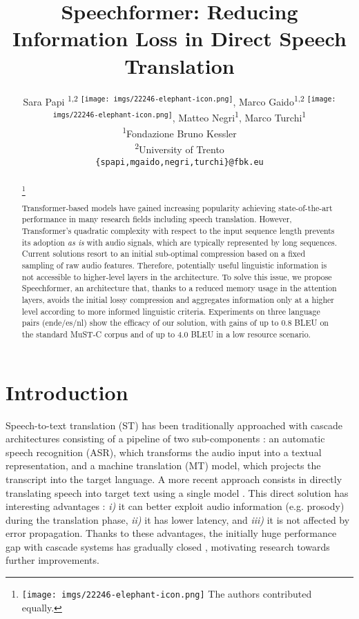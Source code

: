 \documentclass[11pt]{article}
\title{Speechformer: Reducing Information Loss in Direct Speech Translation}
\author{Sara Papi \textsuperscript{1,2 \texttt{[image: imgs/22246-elephant-icon.png]}}, Marco Gaido\textsuperscript{1,2 \texttt{[image: imgs/22246-elephant-icon.png]}}, Matteo Negri\textsuperscript{1}, Marco Turchi\textsuperscript{1} \\
\textsuperscript{1}Fondazione Bruno Kessler \\
\textsuperscript{2}University of Trento \\
\texttt{\{spapi,mgaido,negri,turchi\}@fbk.eu}
}
\begin{document}
\maketitle
\begin{abstract}
\newcommand\blfootnote[1]{\begingroup
  \renewcommand\thefootnote{}\footnote{#1}\addtocounter{footnote}{-1}\endgroup
}
\blfootnote{\texttt{[image: imgs/22246-elephant-icon.png]} The authors contributed equally.}
Transformer-based models have gained increasing popularity achieving state-of-the-art performance in many research fields including speech translation.
However, Transformer's quadratic complexity with respect to the input sequence length prevents its adoption \textit{as is} with audio signals, which are typically represented by long sequences.
Current solutions resort to an initial sub-optimal compression based on a fixed sampling of raw audio features.
Therefore, potentially useful linguistic information is not accessible to higher-level layers in the architecture. 
To solve this issue, we propose Speechformer, an architecture that, thanks to a reduced memory usage in the attention layers, avoids the initial lossy compression and aggregates information only at a higher level according to more informed linguistic criteria.
Experiments on three language pairs (ende/es/nl) show the efficacy of our solution, with gains of up to 0.8 BLEU on the standard MuST-C corpus and of up to 4.0 BLEU in a low resource scenario.
\end{abstract}

\section{Introduction}
Speech-to-text translation (ST) has been traditionally approached with cascade architectures consisting of a pipeline of two sub-components \cite{StentifordSteer88,Waibel1991b}: an automatic speech recognition (ASR), 
which transforms the audio input into a textual representation, and a machine translation (MT) model, which projects the transcript into the target language.
A more recent approach consists in directly translating speech into target text using a single model \cite{berard_2016,weiss2017sequence}.
This direct solution has interesting advantages 
\cite{sperber-paulik-2020-speech}:
\emph{i)} it can better exploit audio information (e.g. prosody) during the translation phase, \emph{ii)} it has lower latency, and \emph{iii)} it is not affected by error propagation. 
Thanks to these advantages, the initially huge performance gap with cascade systems has gradually closed \cite{ansari-etal-2020-findings}, motivating research towards further improvements.
\end{document}
